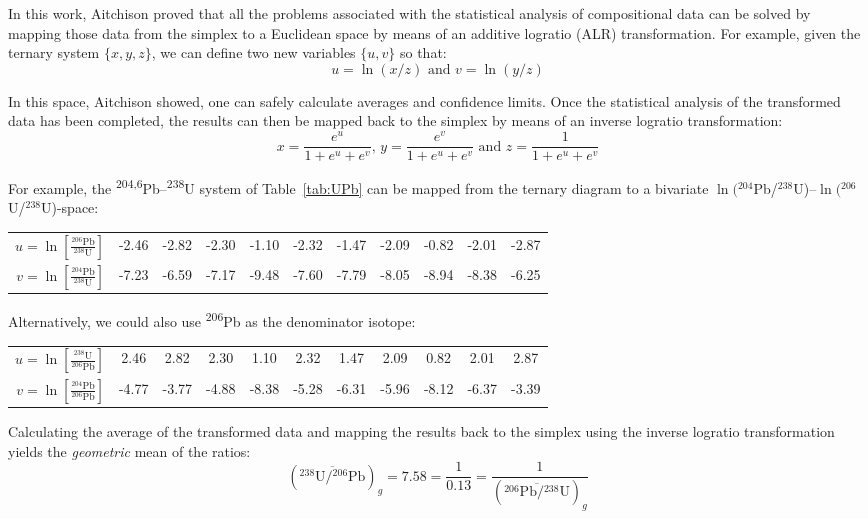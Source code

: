 \documentclass{article}
\begin{document}
In this work, Aitchison proved that all the problems associated with
the statistical analysis of compositional data can be solved by
mapping those data from the simplex to a Euclidean space by means of
an additive logratio (ALR) transformation.  For example, given the
ternary system $\{x,y,z\}$, we can define two new variables $\{u,v\}$
so that:
\begin{equation}
  u = \ln(x/z) \mbox{~and~} v = \ln(y/z)
  \label{eq:xyz2uv}
\end{equation}

In this space, Aitchison showed, one can safely calculate averages and
confidence limits.  Once the statistical analysis of the transformed
data has been completed, the results can then be mapped back to the
simplex by means of an inverse logratio transformation:
\begin{equation}
  x = \frac{e^u}{1+e^u+e^v} \mbox{,~}
  y = \frac{e^v}{1+e^u+e^v}
  \mbox{~and~} z = \frac{1}{1+e^u+e^v}
  \label{eq:uv2xyz}
\end{equation}

For example, the \textsuperscript{204,6}Pb--\textsuperscript{238}U
system of Table~\ref{tab:UPb} can be mapped from the ternary diagram
to a bivariate
$\ln({}^{204}$Pb/${}^{238}$U)--$\ln({}^{206}$U/${}^{238}$U)-space:\medskip

\begin{tabular}{r|cccccccccc}
  $u = \ln\!\left[\frac{{}^{206}\mbox{Pb}}{{}^{238}\mbox{U}}\right]$ &
  -2.46 & -2.82 & -2.30 & -1.10 & -2.32 & -1.47 & -2.09 & -0.82 & -2.01 & -2.87\\
  $v = \ln\!\left[\frac{{}^{204}\mbox{Pb}}{{}^{238}\mbox{U}}\right]$ &
  -7.23 & -6.59 & -7.17 & -9.48 & -7.60 & -7.79 & -8.05 & -8.94 & -8.38 & -6.25
\end{tabular}\medskip

Alternatively, we could also use \textsuperscript{206}Pb as the
denominator isotope:\medskip

\begin{tabular}{r|cccccccccc}
  $u = \ln\!\left[\frac{{}^{238}\mbox{U}}{{}^{206}\mbox{Pb}}\right]$ &
  2.46 & 2.82 & 2.30 & 1.10 & 2.32 & 1.47 & 2.09 & 0.82 & 2.01 & 2.87\\
  $v = \ln\!\left[\frac{{}^{204}\mbox{Pb}}{{}^{206}\mbox{Pb}}\right]$ &
  -4.77 & -3.77 & -4.88 & -8.38 & -5.28 & -6.31 & -5.96 & -8.12 & -6.37 & -3.39
\end{tabular}\medskip

Calculating the average of the transformed data and mapping the
results back to the simplex using the inverse logratio transformation
yields the \emph{geometric} mean of the ratios:
\[
\left(\overline{{}^{238}\mbox{U}/{}^{206}\mbox{Pb}}\right)_{\!g} =
7.58 = \frac{1}{0.13} = 
  \frac{1}{\left(\overline{{}^{206}\mbox{Pb}/{}^{238}\mbox{U}}\right)_{\!g}}  
\]
\end{document}
